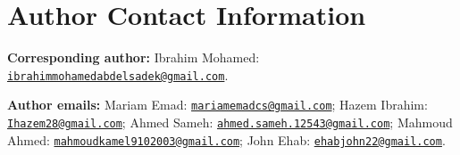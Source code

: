 \documentclass[conference]{IEEEtran}
\begin{document}
\section*{Author Contact Information}
\noindent\textbf{Corresponding author:} Ibrahim Mohamed:
\href{mailto:ibrahimmohamedabdelsadek@gmail.com}{\nolinkurl{ibrahimmohamedabdelsadek@gmail.com}}.

\noindent\textbf{Author emails:} Mariam Emad:
\href{mailto:mariamemadcs@gmail.com}{\nolinkurl{mariamemadcs@gmail.com}}; Hazem Ibrahim:
\href{mailto:Ihazem28@gmail.com}{\nolinkurl{Ihazem28@gmail.com}}; Ahmed Sameh:
\href{mailto:ahmed.sameh.12543@gmail.com}{\nolinkurl{ahmed.sameh.12543@gmail.com}}; Mahmoud Ahmed:
\href{mailto:mahmoudkamel9102003@gmail.com}{\nolinkurl{mahmoudkamel9102003@gmail.com}}; John Ehab:
\href{mailto:ehabjohn22@gmail.com}{\nolinkurl{ehabjohn22@gmail.com}}.



\end{document}
